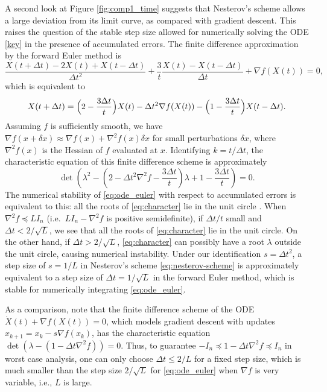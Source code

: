 \documentclass[twoside,11pt]{article}
\def\D{\Delta}
\begin{document}
A second look at Figure \ref{fig:comp1_time} suggests that Nesterov's scheme allows a large deviation from its limit curve, as compared with gradient descent. This raises the question of the stable step size allowed for numerically solving the ODE \eqref{key} in the presence of accumulated errors. The finite difference approximation by the forward Euler method is
\begin{equation}\label{eq:ode_euler}
\frac{X(t+\D t) -2X(t) + X(t-\D t)}{\Delta t^2} + \frac{3}{t}\frac{X(t) - X(t-\D t)}{\D t} + \nabla f(X(t)) = 0,
\end{equation}
which is equivalent to
\begin{equation}\label{eq:like_nesterov}
X(t+\D t) = \Big{(}2 - \frac{3\D t}{t}\Big{)}X(t) - \D t^2 \nabla f(X(t)) -  \Big{(}1 - \frac{3\D t}{t}\Big{)} X(t-\D t).
\end{equation}
Assuming $f$ is sufficiently smooth, we have $\nabla f(x + \delta x) \approx \nabla f(x) + \nabla^2f(x)
\delta x$ for small perturbations $\delta x$, where $\nabla^2f(x)$ is the Hessian of $f$ evaluated at
$x$. Identifying $k = t/\D t$, the characteristic equation of this finite difference scheme is approximately
\begin{equation}\label{eq:character}
\det \left(\lambda^2 - \left( 2 - \Delta t^2 \nabla^2f -\frac{3\D t}{t}\right) \lambda + 1 - \frac{3\D t}{t} \right)= 0.
\end{equation}
The numerical stability of \eqref{eq:ode_euler} with respect to accumulated errors is equivalent to this: all the roots of \eqref{eq:character} lie in the unit circle \citep[see e.g.][]{leadernumerical}. When $\nabla^2f \preceq L I_n$ (i.e.~$LI_n - \nabla^2 f$ is positive semidefinite), if $\Delta t/t$ small and $\Delta t <
2/\sqrt{L}$, we see that all the roots of \eqref{eq:character} lie in
the unit circle. On the other hand, if $\Delta t > 2/\sqrt{L}$,
\eqref{eq:character} can possibly have a root $\lambda$ outside the
unit circle, causing numerical instability. Under our identification
$s = \D t^2$, a step size of $s = 1/L$ in Nesterov's scheme
\eqref{eq:nesterov-scheme} is approximately equivalent to a step size
of $\D t = 1/\sqrt{L}$ in the forward Euler method, which is stable
for numerically integrating \eqref{eq:ode_euler}.

As a comparison, note that the finite difference scheme of the ODE $\dot{X}(t) + \nabla f(X(t)) = 0$, which models gradient descent
with updates $x_{k+1} = x_k - s\nabla f(x_k)$, has the characteristic equation
$\det(\lambda - (1 - \Delta t \nabla^2 f)) = 0$. Thus, to guarantee
$-I_n \preceq 1 - \Delta t \nabla^2 f \preceq I_n$ in worst case
analysis, one can only choose $\Delta t \le 2/L$ for a fixed step
size, which is much smaller than the step size $2/\sqrt{L}$ for \eqref{eq:ode_euler} when $\nabla f$ is very variable, i.e., $L$ is large.
\end{document}
